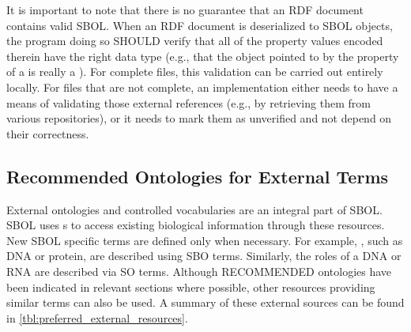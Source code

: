 It is important to note that there is no guarantee that an RDF document
contains valid SBOL. When an RDF document is deserialized to SBOL
objects, the program doing so SHOULD verify that all of the property
values encoded therein have the right data type (e.g., that the object
pointed to by the  property of a
 is really a ).
For complete files, this validation can be carried out entirely locally. For files that are not complete, an implementation either needs to
have a means of validating those external references (e.g., by
retrieving them from various repositories), or it needs to mark them as
unverified and not depend on their correctness.

\subsection{Recommended Ontologies for External Terms}
\label{sec:recomm_ontologies}

External ontologies and controlled vocabularies are an integral part of SBOL. SBOL uses s to access existing biological information through these resources. New SBOL specific terms are defined only when necessary. For example,  , such as DNA or protein, are described using SBO terms. Similarly, the roles of a DNA or RNA  are described via SO terms. Although RECOMMENDED ontologies have been indicated in relevant sections where possible, other resources providing similar terms can also be used. A summary of these external sources can be found in \ref{tbl:preferred_external_resources}.

